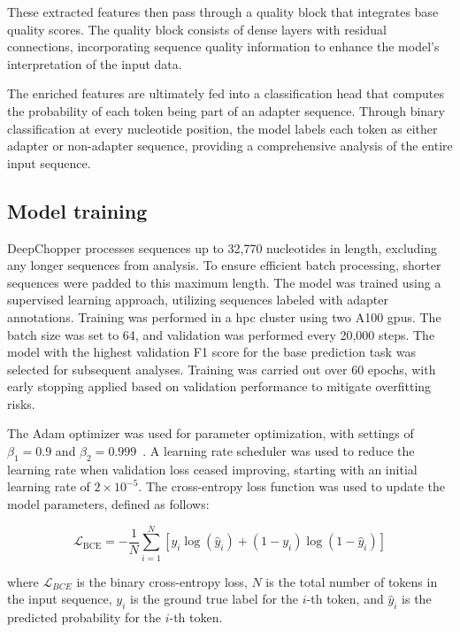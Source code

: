 \documentclass[pdflatex,sn-nature, lineno]{sn-jnl}%
\begin{document}
These extracted features then pass through a quality block that integrates base quality scores.
The quality block consists of dense layers with residual connections, incorporating sequence quality information to enhance the model's interpretation of the input data.

The enriched features are ultimately fed into a classification head that computes the probability of each token being part of an adapter sequence.
Through binary classification at every nucleotide position, the model labels each token as either adapter or non-adapter sequence, providing a comprehensive analysis of the entire input sequence.


\subsection{Model training}\label{ssec:training}

DeepChopper processes sequences up to 32,770 nucleotides in length, excluding any longer sequences from analysis.
To ensure efficient batch processing, shorter sequences were padded to this maximum length.
The model was trained using a supervised learning approach, utilizing sequences labeled with adapter annotations.
Training was performed in a \gls{hpc} cluster using two A100 \glspl{gpu}.
The batch size was set to 64, and validation was performed every 20,000 steps.
The model with the highest validation F1 score for the base prediction task was selected for subsequent analyses.
Training was carried out over \num{60} epochs, with early stopping applied based on validation performance to mitigate overfitting risks.

The Adam optimizer was used for parameter optimization, with settings of \( \beta_{1} = 0.9 \) and \( \beta_{2} = 0.999 \)~\cite{kingma2014adam}.
A learning rate scheduler was used to reduce the learning rate when validation loss ceased improving, starting with an initial learning rate of \( 2 \times 10^{-5} \).
The cross-entropy loss function was used to update the model parameters, defined as follows:

\[
	\mathcal{L}_{\textrm{BCE}} = -\frac{1}{N} \sum_{i=1}^{N} [y_i \log(\hat{y}_i) + (1 - y_i) \log(1 - \hat{y}_i)]
\]

where \(\mathcal{L}_{BCE}\) is the binary cross-entropy loss, \(N\) is the total number of tokens in the input sequence, \(y_i\) is the ground true label for the \(i\)-th token, and \(\hat{y}_i\) is the predicted probability for the \(i\)-th token.
\end{document}
